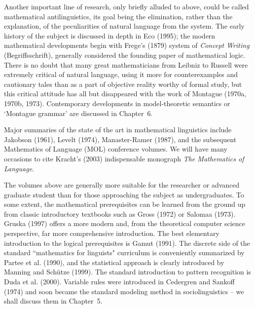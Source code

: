 Another important line of research, only briefly alluded to above, could be
called mathematical antilinguistics, its goal being the elimination, rather
than the explanation, of the peculiarities of natural language from the
system. The early history of the subject is discussed in depth in Eco (1995);
\nocite{Eco:1995}
the modern mathematical developments begin with Frege's (1879) system of {\it
Concept Writing} (Begriffsschrift), generally considered the founding paper of
mathematical logic. There is no doubt that many great mathematicians from
Leibniz to Russell were extremely critical of natural language, using it more
for counterexamples and cautionary tales than as a part of objective reality
worthy of formal study, but this critical attitude has all but disappeared
with the work of Montague (1970a, 1970b, 1973). Contemporary developments in 
model-theoretic semantics or `Montague grammar' are discussed in Chapter~6.

\nocite{Staal:1962}\nocite{Staal:1967} 
\nocite{Cardona:1965}\nocite{Cardona:1969} 
\nocite{Cardona:1970}\nocite{Cardona:1976} 
\nocite{Cardona:1988}\nocite{Frege:1879}
\nocite{Kiparsky:1979}\nocite{Kiparsky:2002}
\nocite{Aronoff:1985}\nocite{Bloomfield:1926} 
\nocite{Levelt:1974}\nocite{Manaster-Ramer:1987}
\nocite{Gross:1972}\nocite{Kiparsky:1982a}

Major summaries of the state of the art in mathematical linguistics include
Jakobson (1961), Levelt (1974), Manaster-Ramer (1987), and the subsequent
Mathematics of Language (MOL) conference volumes. We will have many occasions
to cite Kracht's (2003) indispensable monograph {\it The Mathematics of
Language}.

The volumes above are generally more suitable for the researcher or advanced
graduate student than for those approaching the subject as undergraduates.  To
some extent, the mathematical prerequisites can be learned from the ground up
from classic introductory textbooks such as Gross (1972) or Salomaa (1973).
Gruska (1997) offers a more modern and, from the theoretical computer science
perspective, far more comprehensive introduction.  The best elementary
introduction to the logical prerequisites is Gamut (1991). The discrete side
of the standard ``mathematics for linguists" curriculum is conveniently
summarized by Partee et al. (1990), and the statistical approach is clearly
introduced by Manning and Sch\"{u}tze (1999). The standard introduction to
pattern recognition is Duda et al. (2000).  Variable rules were introduced in
Cedergren and Sankoff (1974) \nocite{Cedergren:1974} and soon became the
standard modeling method in sociolinguistics -- we shall discuss them in
Chapter~5. 


\endinput

Indexed, head, combinatory categorial, and tree-adjoining grammars are
discussed further in Chapter~5. 

Cedergren, Henrietta J. and David Sankoff. 1974. Variable rules: Performance
as a statistical reflection of competence. Language 50, 333-55

Sankoff, David (1985). Statistics in linguistics. New York Encyclopaedia of
the statistical sciences 5. Wiley. 74-81. 




